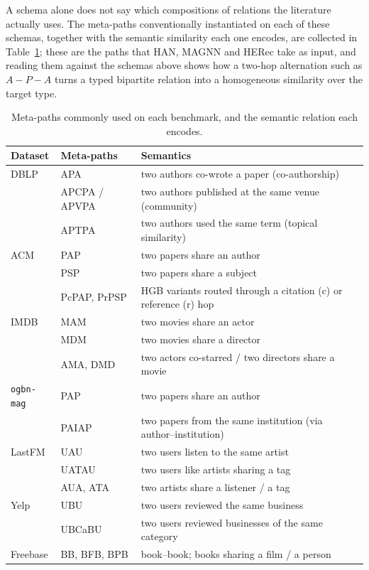 A schema alone does not say which compositions of relations the literature actually uses. The
meta-paths conventionally instantiated on each of these schemas, together with the semantic
similarity each one encodes, are collected in Table~\ref{p2:tab:metapaths}; these are the paths
that HAN, MAGNN and HERec take as input, and reading them against the schemas above shows how a
two-hop alternation such as $A\!-\!P\!-\!A$ turns a typed bipartite relation into a homogeneous
similarity over the target type.

\begin{table}[H]
\centering
\small
\caption{Meta-paths commonly used on each benchmark, and the semantic relation each encodes.}
\label{p2:tab:metapaths}
\begin{tabular}{llp{7.6cm}}
\toprule
Dataset & Meta-paths & Semantics \\
\midrule
DBLP & APA & two authors co-wrote a paper (co-authorship) \\
     & APCPA / APVPA & two authors published at the same venue (community) \\
     & APTPA & two authors used the same term (topical similarity) \\
\midrule
ACM  & PAP & two papers share an author \\
     & PSP & two papers share a subject \\
     & PcPAP, PrPSP & HGB variants routed through a citation (c) or reference (r) hop \\
\midrule
IMDB & MAM & two movies share an actor \\
     & MDM & two movies share a director \\
     & AMA, DMD & two actors co-starred / two directors share a movie \\
\midrule
\texttt{ogbn-mag} & PAP & two papers share an author \\
     & PAIAP & two papers from the same institution (via author--institution) \\
\midrule
LastFM & UAU & two users listen to the same artist \\
     & UATAU & two users like artists sharing a tag \\
     & AUA, ATA & two artists share a listener / a tag \\
\midrule
Yelp & UBU & two users reviewed the same business \\
     & UBCaBU & two users reviewed businesses of the same category \\
\midrule
Freebase & BB, BFB, BPB & book--book; books sharing a film / a person \\
\bottomrule
\end{tabular}
\end{table}

